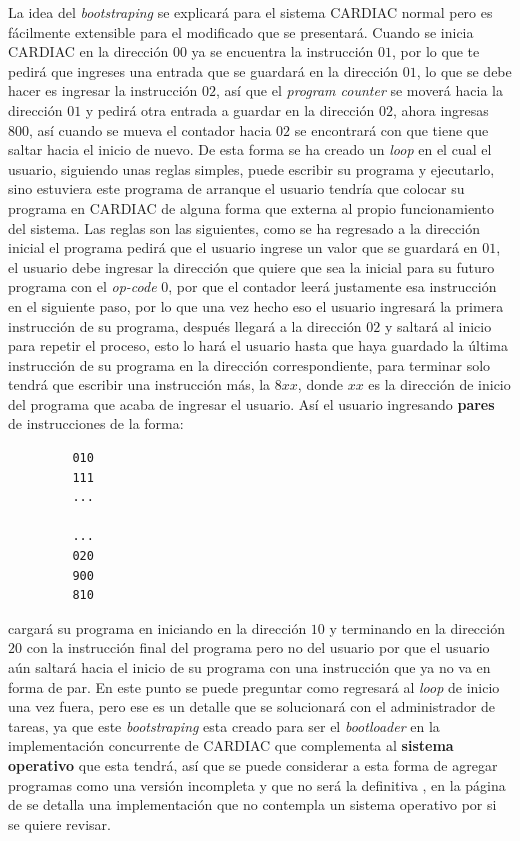 \documentclass[12pt]{article}
\begin{document}
	 La idea del \textit{bootstraping} se explicará para el sistema CARDIAC normal pero es fácilmente extensible para el modificado
	 que se presentará. Cuando se inicia CARDIAC en la dirección $00$ ya se encuentra la instrucción $01$, por lo que te pedirá
	 que ingreses una entrada que se guardará en la dirección $01$, lo que se debe hacer es ingresar la instrucción $02$, así
	 que el \textit{program counter} se moverá hacia la dirección $01$ y pedirá otra entrada a guardar en la dirección $02$, ahora
	 ingresas $800$, así cuando se mueva el contador hacia $02$ se encontrará con que tiene que saltar hacia el inicio de nuevo. De
	 esta forma se ha creado un \textit{loop} en el cual el usuario, siguiendo unas reglas simples, puede escribir su programa
	 y ejecutarlo, sino estuviera este programa de arranque el usuario tendría que colocar su programa en CARDIAC de alguna forma
	 que externa al propio funcionamiento del sistema. Las reglas son las siguientes, como se ha regresado a la dirección
	 inicial el programa pedirá que el usuario ingrese un valor que se guardará en $01$, el usuario debe ingresar la dirección que
	 quiere que sea la inicial para su futuro programa con el \textit{op-code} $0$, por que el contador leerá justamente esa instrucción
	 en el siguiente paso, por lo que una vez hecho eso el usuario ingresará la primera instrucción de su programa, después llegará a la
	 dirección $02$ y saltará al inicio para repetir el proceso, esto lo hará el usuario hasta que haya guardado la última instrucción
	 de su programa en la dirección correspondiente, para terminar solo tendrá que escribir una instrucción más, la $8xx$, donde
	 $xx$ es la dirección de inicio del programa que acaba de ingresar el usuario. Así el usuario ingresando \textbf{pares} de 
	 instrucciones de la forma:
	
	 \begin{verbatim}
		 010
		 111
		 ...
		 
		 ...		 
		 020
		 900
		 810
	 \end{verbatim}
	
	cargará su programa en iniciando en la dirección $10$ y terminando en la dirección $20$ con la instrucción final del programa pero
	no del usuario por que el usuario aún saltará hacia el inicio de su programa con una instrucción que ya no va en forma de par. En
	este punto se puede preguntar como regresará al \textit{loop} de inicio una vez fuera, pero ese es un detalle que se solucionará con
	el administrador de tareas, ya que este \textit{bootstraping} esta creado para ser el \textit{bootloader} en la implementación concurrente
	de CARDIAC que complementa al \textbf{sistema operativo} que esta tendrá, así que se puede considerar a esta forma de
	agregar programas como una versión incompleta y que no será la definitiva
	, en la página de \cite{noauthor_cardiac_nodate} se detalla una implementación que no contempla un sistema operativo por si se quiere revisar.
	
\end{document}
